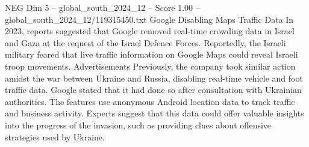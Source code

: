 \begin{textsample}{NEG Dim 5 – global\_south\_2024\_12 – Score 1.00 – global\_south\_2024\_12/119315450.txt}
Google Disabling Maps Traffic Data In 2023, reports suggested that Google removed real-time crowding data in Israel and Gaza at the request of the Israel Defence Forces.
Reportedly, the Israeli military feared that live traffic information on Google Maps could reveal Israeli troop movements.
Advertisements Previously, the company took similar action amidst the war between Ukraine and Russia, disabling real-time vehicle and foot traffic data.
Google stated that it had done so after consultation with Ukrainian authorities.
The features use anonymous Android location data to track traffic and business activity.
Experts suggest that this data could offer valuable insights into the progress of the invasion, such as providing clues about offensive strategies used by Ukraine.

\end{textsample}
